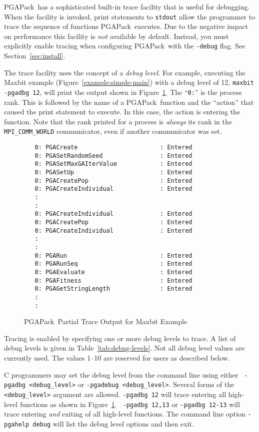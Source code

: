 \documentclass{report}
\newcommand{\pga}{PGAPack}
\begin{document}
\pga\ has a sophisticated built-in trace facility that is useful for
debugging.  When the facility is invoked, print statements to {\tt stdout}
allow the programmer to trace the sequence of functions \pga\ executes.  Due
to the negative impact on performance this facility is {\em not} available by
default.  Instead, you must explicitly enable tracing when configuring 
\pga\  with the {\tt -debug} flag.  See 
Section~\ref{sec:install}.

The trace facility uses the concept  of a {\em debug
level}.  For example, executing the Maxbit example
(Figure~\ref{example:simple-main}) with a debug level of 12, {\tt maxbit
-pgadbg 12}, will print the output shown in Figure~\ref{fig:trace}.  The
``{\tt 0:}'' is the process rank.  This is followed by the name of a
\pga\ function and the ``action'' that caused the print statement to execute.
In this case, the action is entering the function.  Note that the rank printed
for a process is {\em always} its rank in the {\tt MPI\_COMM\_WORLD}
communicator, even if another communicator was set.


\begin{figure}
\begin{verbatim}
   0: PGACreate                       : Entered
   0: PGASetRandomSeed                : Entered
   0: PGASetMaxGAIterValue            : Entered
   0: PGASetUp                        : Entered
   0: PGACreatePop                    : Entered
   0: PGACreateIndividual             : Entered
   :
   :
   0: PGACreateIndividual             : Entered
   0: PGACreatePop                    : Entered
   0: PGACreateIndividual             : Entered
   :
   :
   0: PGARun                          : Entered
   0: PGARunSeq                       : Entered
   0: PGAEvaluate                     : Entered
   0: PGAFitness                      : Entered
   0: PGAGetStringLength              : Entered
   :
   :
\end{verbatim}
\caption{\pga\ Partial Trace Output for Maxbit Example}
\label{fig:trace}
\end{figure}


Tracing is enabled by specifying one or more debug levels to trace.  A list of
debug levels is given in Table~\ref{tab:debug-levels}.  Not all debug level
values are currently used.  The values 1--10 are reserved for users as
described below.

C programmers may set the debug level from the command line using either {\tt
-pgadbg <debug\_level>} or {\tt -pgadebug <debug\_level>}.  Several forms of
the {\tt <debug\_level>} argument are allowed.  {\tt -pgadbg 12} will trace
entering all high-level functions as shown in Figure~\ref{fig:trace}.  {\tt
-pgadbg 12,13} or {\tt -pgadbg 12-13} will trace entering {\em and} exiting of
all high-level functions.  The command line option {\tt -pgahelp debug} will
list the debug level options and then exit.
\end{document}
